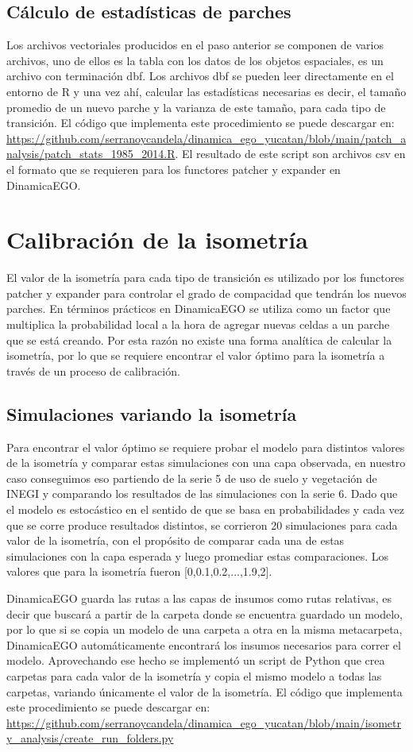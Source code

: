 \documentclass[12pt,a4paper,oldfontcommands]{article}
\begin{document}
\subsection{Cálculo de estadísticas de parches}
Los archivos vectoriales producidos en el paso anterior se componen de varios archivos, uno de ellos es la tabla con los datos de los objetos espaciales, es un archivo con terminación dbf. Los archivos dbf se pueden leer directamente en el entorno de R y una vez ahí, calcular las estadísticas necesarias es decir, el tamaño promedio de un nuevo parche y la varianza de este tamaño, para cada tipo de transición. El código que implementa este procedimiento se puede descargar en:  \url{https://github.com/serranoycandela/dinamica_ego_yucatan/blob/main/patch_analysis/patch_stats_1985_2014.R}. El resultado de este script son archivos csv en el formato que se requieren para los functores patcher y expander en DinamicaEGO.
\section{Calibración de la isometría}
El valor de la isometría para cada tipo de transición es utilizado por los functores patcher y expander para controlar el grado de compacidad que tendrán los nuevos parches. En términos prácticos en DinamicaEGO se utiliza como un factor que multiplica la probabilidad local a la hora de agregar nuevas celdas a un parche que se está creando. Por esta razón no existe una forma analítica de calcular la isometría, por lo que se requiere encontrar el valor óptimo para la isometría a través de un proceso de calibración. 
\subsection{Simulaciones variando la isometría}
Para encontrar el valor óptimo se requiere probar el modelo para distintos valores de la isometría y comparar estas simulaciones con una capa observada, en nuestro caso conseguimos eso partiendo de la serie 5 de uso de suelo y vegetación de INEGI y comparando los resultados de las simulaciones con la serie 6. Dado que el modelo es estocástico en el sentido de que se basa en probabilidades y cada vez que se corre produce resultados distintos, se corrieron 20 simulaciones para cada valor de la isometría, con el propósito de comparar cada una de estas simulaciones con la capa esperada y luego promediar estas comparaciones. Los valores que para la isometría fueron [0,0.1,0.2,...,1.9,2].

DinamicaEGO guarda las rutas a las capas de insumos como rutas relativas, es decir que buscará a partir de la carpeta donde se encuentra guardado un modelo, por lo que si se copia un modelo de una carpeta a otra en la misma metacarpeta, DinamicaEGO automáticamente encontrará los insumos necesarios para correr el modelo. Aprovechando ese hecho se implementó un script de Python que crea carpetas para cada valor de la isometría y copia el mismo modelo a todas las carpetas, variando únicamente el valor de la isometría. El código que implementa este procedimiento se puede descargar en:  \url{https://github.com/serranoycandela/dinamica_ego_yucatan/blob/main/isometry_analysis/create_run_folders.py}
\end{document}
